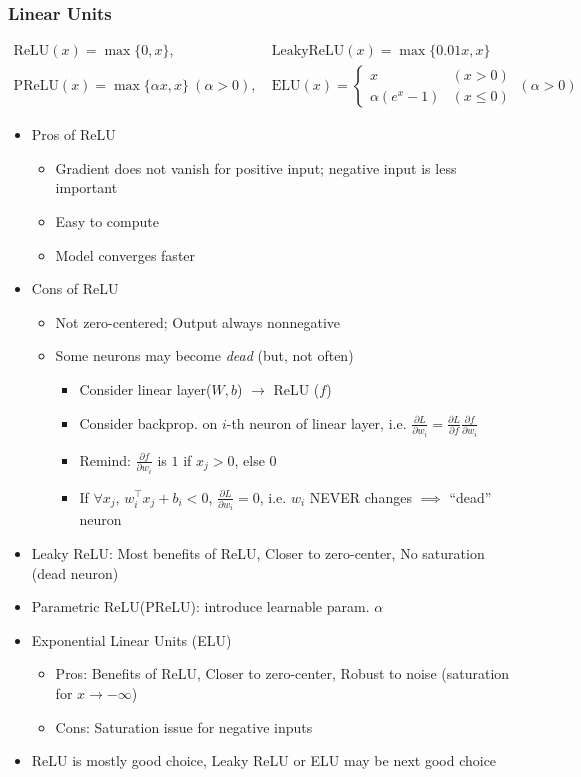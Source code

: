 \subsubsection*{Linear Units}
\begin{equation}\begin{aligned}
    \text{ReLU}(x)=\max\{0,x\},&~\text{LeakyReLU}(x)=\max\{0.01 x,x\}\\
    \text{PReLU}(x)=\max\{\alpha x,x\}~(\alpha>0),&~\text{ELU}(x)=\begin{cases}
        x & (x>0) \\
        \alpha(e^x-1) & (x\leq 0)
    \end{cases}~(\alpha>0)
\end{aligned}\end{equation}
\begin{itemize}
    \item Pros of ReLU
    \begin{itemize}
        \item Gradient does not vanish for positive input; negative input is less important
        \item Easy to compute
        \item Model converges faster
    \end{itemize}
    \item Cons of ReLU
    \begin{itemize}
        \item Not zero-centered; Output always nonnegative
        \item Some neurons may become \textit{dead} (but, not often)
        \begin{itemize}
            \item Consider linear layer($W,b$) $\to$ ReLU ($f$)
            \item Consider backprop. on $i$-th neuron of linear layer, i.e. $\frac{\partial L}{\partial w_i}=\frac{\partial L}{\partial f}\frac{\partial f}{\partial w_i}$
            \item Remind: $\frac{\partial f}{\partial w_i}$ is $1$ if $x_j>0$, else $0$
            \item If $\forall x_j$, $w_i^{\top}x_j+b_i<0$, $\frac{\partial L}{\partial w_i}=0$, i.e. $w_i$ NEVER changes $\implies$ ``dead'' neuron
        \end{itemize}
    \end{itemize}
    \item Leaky ReLU: Most benefits of ReLU, Closer to zero-center, No saturation (dead neuron)
    \item Parametric ReLU(PReLU): introduce learnable param. $\alpha$
    \item Exponential Linear Units (ELU)
    \begin{itemize}
        \item Pros: Benefits of ReLU, Closer to zero-center, Robust to noise (saturation for $x\to-\infty$)
        \item Cons: Saturation issue for negative inputs
    \end{itemize}
    \item ReLU is mostly good choice, Leaky ReLU or ELU may be next good choice
\end{itemize}
